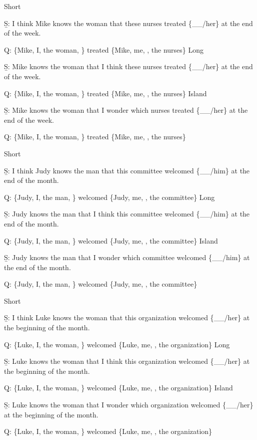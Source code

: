 \pex 
\a Short\par\nobreak
\beginsubsub 
\b{S:} I think Mike knows the woman that these nurses treated \{\_\_/her\} at the end of the week.\par\nobreak
\b{Q:} \{Mike, I, the woman, \} treated \{Mike, me, , the nurses\}
\endsubsub
\a Long\par\nobreak
\beginsubsub
\b{S:} Mike knows the woman that I think these nurses treated \{\_\_/her\} at the end of the week.\par\nobreak
\b{Q:} \{Mike, I, the woman, \} treated \{Mike, me, , the nurses\}
\endsubsub
\a Island\par\nobreak
\beginsubsub
\b{S:} Mike knows the woman that I wonder which nurses treated \{\_\_/her\} at the end of the week.\par\nobreak
\b{Q:} \{Mike, I, the woman, \} treated \{Mike, me, , the nurses\}
\endsubsub
\xe

\pex 
\a Short\par\nobreak
\beginsubsub 
\b{S:} I think Judy knows the man that this committee welcomed \{\_\_/him\} at the end of the month.\par\nobreak
\b{Q:} \{Judy, I, the man, \} welcomed \{Judy, me, , the committee\}
\endsubsub
\a Long\par\nobreak
\beginsubsub
\b{S:} Judy knows the man that I think this committee welcomed \{\_\_/him\} at the end of the month.\par\nobreak
\b{Q:} \{Judy, I, the man, \} welcomed \{Judy, me, , the committee\}
\endsubsub
\a Island\par\nobreak
\beginsubsub
\b{S:} Judy knows the man that I wonder which committee welcomed \{\_\_/him\} at the end of the month.\par\nobreak
\b{Q:} \{Judy, I, the man, \} welcomed \{Judy, me, , the committee\}
\endsubsub
\xe

\pex 
\a Short\par\nobreak
\beginsubsub 
\b{S:} I think Luke knows the woman that this organization welcomed \{\_\_/her\} at the beginning of the month.\par\nobreak
\b{Q:} \{Luke, I, the woman, \} welcomed \{Luke, me, , the organization\}
\endsubsub
\a Long\par\nobreak
\beginsubsub
\b{S:} Luke knows the woman that I think this organization welcomed \{\_\_/her\} at the beginning of the month.\par\nobreak
\b{Q:} \{Luke, I, the woman, \} welcomed \{Luke, me, , the organization\}
\endsubsub
\a Island\par\nobreak
\beginsubsub
\b{S:} Luke knows the woman that I wonder which organization welcomed \{\_\_/her\} at the beginning of the month.\par\nobreak
\b{Q:} \{Luke, I, the woman, \} welcomed \{Luke, me, , the organization\}
\endsubsub
\xe

